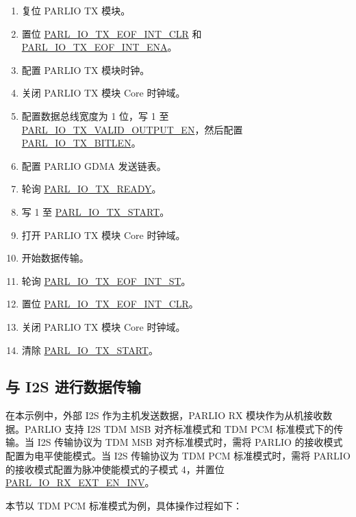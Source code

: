 \documentclass[main\_\_CN.tex]{subfiles}
\begin{document}
\begin{itemize}
\begin{enumerate}
        \item 复位 PARLIO TX 模块。
        \item 置位 \hyperref[fielddesc:PARLIOTXEOFINTCLR]{PARL\_IO\_TX\_EOF\_INT\_CLR} 和 \hyperref[fielddesc:PARLIOTXEOFINTENA]{PARL\_IO\_TX\_EOF\_INT\_ENA}。
        \item 配置 PARLIO TX 模块时钟。
        \item 关闭 PARLIO TX 模块 Core 时钟域。
        \item 配置数据总线宽度为 1 位，写 1 至 \hyperref[fielddesc:PARLIOTXVALIDOUTPUTEN]{PARL\_IO\_TX\_VALID\_OUTPUT\_EN}，然后配置 \hyperref[fielddesc:PARLIOTXBITLEN]{PARL\_IO\_TX\_BITLEN}。
        \item 配置 PARLIO GDMA 发送链表。
        \item 轮询 \hyperref[fielddesc:PARLIOTXREADY]{PARL\_IO\_TX\_READY}。
        \item 写 1 至 \hyperref[fielddesc:PARLIOTXSTART]{PARL\_IO\_TX\_START}。
        \item 打开 PARLIO TX 模块 Core 时钟域。
        \item 开始数据传输。
        \item 轮询 \hyperref[fielddesc:PARLIOTXEOFINTST]{PARL\_IO\_TX\_EOF\_INT\_ST}。
        \item 置位 \hyperref[fielddesc:PARLIOTXEOFINTCLR]{PARL\_IO\_TX\_EOF\_INT\_CLR}。
        \item 关闭 PARLIO TX 模块 Core 时钟域。
        \item 清除 \hyperref[fielddesc:PARLIOTXSTART]{PARL\_IO\_TX\_START}。
    \end{enumerate}
\end{itemize}

\subsection{与 I2S 进行数据传输}

在本示例中，外部 I2S 作为主机发送数据，PARLIO RX 模块作为从机接收数据。PARLIO 支持 I2S TDM MSB 对齐标准模式和 TDM PCM 标准模式下的传输。当 I2S 传输协议为 TDM MSB 对齐标准模式时，需将 PARLIO 的接收模式配置为电平使能模式。当 I2S 传输协议为 TDM PCM 标准模式时，需将 PARLIO 的接收模式配置为脉冲使能模式的子模式 4，并置位 \hyperref[fielddesc:PARLIORXEXTENINV]{PARL\_IO\_RX\_EXT\_EN\_INV}。

本节以 TDM PCM 标准模式为例，具体操作过程如下：
\end{document}
